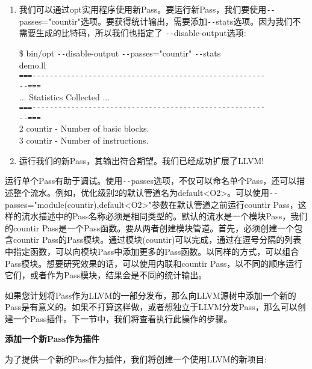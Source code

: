 \begin{enumerate}
\item 我们可以通过opt实用程序使用新Pass。要运行新Pass，我们要使用\verb|--|passes="countir"选项。要获得统计输出，需要添加\verb|--|stats选项。因为我们不需要生成的比特码，所以我们也指定了 \verb|--|disable-output选项:
\begin{tcolorbox}[colback=white,colframe=black]
\$ bin/opt \verb|--|disable-output \verb|--|passes="countir" \verb|--|stats  \\
demo.ll \\
\verb|===------------------------------------------------------| \\
\verb|--===| \\
... Statistics Collected ... \\
\verb|===------------------------------------------------------| \\
\verb|--===| \\
2 countir - Number of basic blocks. \\
3 countir - Number of instructions.
\end{tcolorbox}
	
\item 运行我们的新Pass，其输出符合期望。我们已经成功扩展了LLVM!
	
\end{enumerate}

运行单个Pass有助于调试。使用\verb|--|passes选项，不仅可以命名单个Pass，还可以描述整个流水。例如，优化级别2的默认管道名为default<O2>。可以使用\verb|--|passes="module(countir),default<O2>"参数在默认管道之前运行countir Pass，这样的流水描述中的Pass名称必须是相同类型的。默认的流水是一个模块Pass，我们的countir Pass是一个Pass函数。要从两者创建模块管道。首先，必须创建一个包含countir Pass的Pass模块。通过模块(countir)可以完成，通过在逗号分隔的列表中指定函数，可以向模块Pass中添加更多的Pass函数。以同样的方式，可以组合Pass模块。想要研究效果的话，可以使用内联和countir Pass，以不同的顺序运行它们，或者作为Pass模块，结果会是不同的统计输出。\par

如果您计划将Pass作为LLVM的一部分发布，那么向LLVM源树中添加一个新的Pass是有意义的。如果不打算这样做，或者想独立于LLVM分发Pass，那么可以创建一个Pass插件。下一节中，我们将查看执行此操作的步骤。\par


\hspace*{\fill} \par %
\textbf{添加一个新Pass作为插件}

为了提供一个新的Pass作为插件，我们将创建一个使用LLVM的新项目:\par

